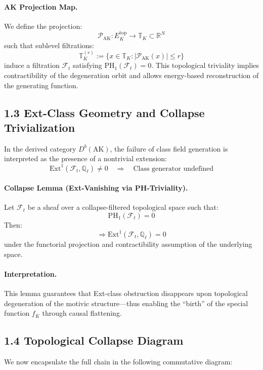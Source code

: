 \documentclass[11pt]{article}
\begin{document}
\paragraph{AK Projection Map.}
We define the projection:
\[
\mathcal{P}_{\text{AK}}: E_K^{\mathrm{top}} \rightarrow \mathbb{T}_K \subset \mathbb{R}^N
\]
such that sublevel filtrations:
\[
\mathbb{T}_K^{(r)} := \{ x \in \mathbb{T}_K : |\mathcal{P}_{\text{AK}}(x)| \leq r \}
\]
induce a filtration \( \mathcal{F}_t \) satisfying \( \mathrm{PH}_1(\mathcal{F}_t) = 0 \). This topological triviality implies contractibility of the degeneration orbit and allows energy-based reconstruction of the generating function.

\subsection*{1.3 Ext-Class Geometry and Collapse Trivialization}

In the derived category \( D^b(\text{AK}) \), the failure of class field generation is interpreted as the presence of a nontrivial extension:
\[
\mathrm{Ext}^1(\mathcal{F}_t, \mathbb{Q}_\ell) \neq 0 \quad \Rightarrow \quad \text{Class generator undefined}
\]

\paragraph{Collapse Lemma (Ext-Vanishing via PH-Triviality).}
Let \( \mathcal{F}_t \) be a sheaf over a collapse-filtered topological space such that:
\[
\mathrm{PH}_1(\mathcal{F}_t) = 0
\]
Then:
\[
\Rightarrow \mathrm{Ext}^1(\mathcal{F}_t, \mathbb{Q}_\ell) = 0
\]
under the functorial projection and contractibility assumption of the underlying space.

\paragraph{Interpretation.}
This lemma guarantees that Ext-class obstruction disappears upon topological degeneration of the motivic structure—thus enabling the “birth” of the special function \( f_K \) through causal flattening.

\subsection*{1.4 Topological Collapse Diagram}

We now encapsulate the full chain in the following commutative diagram:
\end{document}
